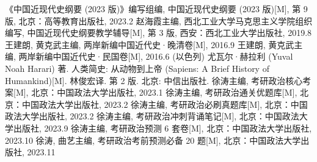 \documentclass[10pt, UTF8]{book} %
\begin{document}
\newpage
\thispagestyle{empty}
\begin{thebibliography}{1}
    《中国近现代史纲要 (2023 版)》编写组编, 中国近现代史纲要 (2023 版)[M], 第 9 版, 
    北京：高等教育出版社, 2023.2
    赵海霞主编, 西北工业大学马克思主义学院组织编写, 中国近现代史纲要教学辅导[M], 第 3 版, 
    西安：西北工业大学出版社, 2019.8
    王建朗, 黄克武主编, 两岸新编中国近代史·晚清卷[M], 2016.9
    王建朗, 黄克武主编, 两岸新编中国近代史·民国卷[M], 2016.6
    (以色列) 尤瓦尔·赫拉利 (Yuval Noah Harari) 著. 人类简史: 从动物到上帝 (Sapiens: A Brief History
    of Humankind)[M]. 林俊宏译. 第 2 版.
    北京: 中信出版社.
    徐涛主编, 考研政治核心考案[M], 北京：中国政法大学出版社, 2023.1
    徐涛主编, 考研政治通关优题库[M], 北京：中国政法大学出版社, 2023.2
    徐涛主编, 考研政治必刷真题库[M], 北京：中国政法大学出版社, 2023.2
    徐涛主编, 考研政治冲刺背诵笔记[M], 北京：中国政法大学出版社, 2023.9
    徐涛主编, 考研政治预测 6 套卷[M], 北京：中国政法大学出版社, 2023.10
    徐涛, 曲艺主编, 考研政治考前预测必备 20 题[M], 北京：中国政法大学出版社, 2023.11
\end{thebibliography}




\newpage
\thispagestyle{empty}


\end{document}
